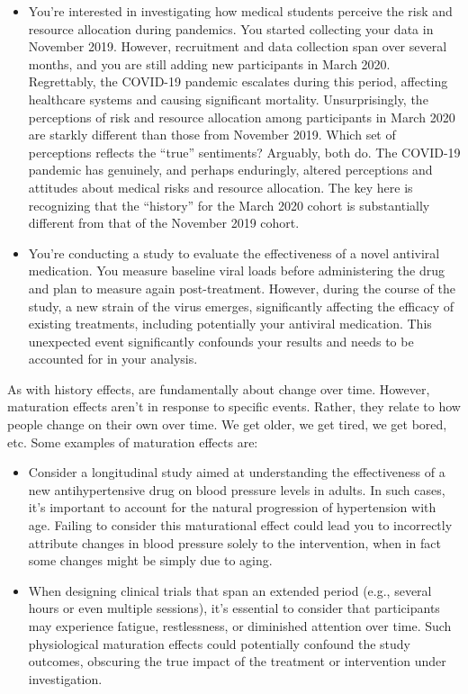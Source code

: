 \begin{itemize}
\item You're interested in investigating how medical students perceive the risk and resource allocation during pandemics. You started collecting your data in November 2019. However, recruitment and data collection span over several months, and you are still adding new participants in March 2020. Regrettably, the COVID-19 pandemic escalates during this period, affecting healthcare systems and causing significant mortality. Unsurprisingly, the perceptions of risk and resource allocation among participants in March 2020 are starkly different than those from November 2019. Which set of perceptions reflects the ``true'' sentiments? Arguably, both do. The COVID-19 pandemic has genuinely, and perhaps enduringly, altered perceptions and attitudes about medical risks and resource allocation. The key here is recognizing that the ``history'' for the March 2020 cohort is substantially different from that of the November 2019 cohort. 

\item You're conducting a study to evaluate the effectiveness of a novel antiviral medication. You measure baseline viral loads before administering the drug and plan to measure again post-treatment. However, during the course of the study, a new strain of the virus emerges, significantly affecting the efficacy of existing treatments, including potentially your antiviral medication. This unexpected event significantly confounds your results and needs to be accounted for in your analysis. 
\end{itemize}


As with history effects,  are fundamentally about change over time. However, maturation effects aren't in response to specific events. Rather, they relate to how people change on their own over time. We get older, we get tired, we get bored, etc. Some examples of maturation effects are:

\begin{itemize}
\item Consider a longitudinal study aimed at understanding the effectiveness of a new antihypertensive drug on blood pressure levels in adults. In such cases, it's important to account for the natural progression of hypertension with age. Failing to consider this maturational effect could lead you to incorrectly attribute changes in blood pressure solely to the intervention, when in fact some changes might be simply due to aging.
\item When designing clinical trials that span an extended period (e.g., several hours or even multiple sessions), it's essential to consider that participants may experience fatigue, restlessness, or diminished attention over time. Such physiological maturation effects could potentially confound the study outcomes, obscuring the true impact of the treatment or intervention under investigation.
\end{itemize}

